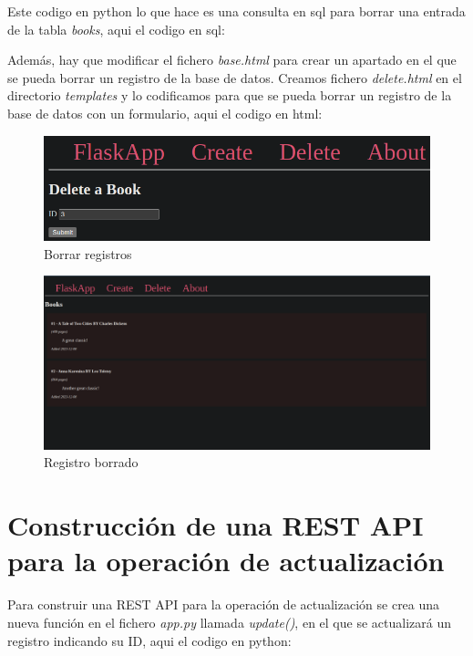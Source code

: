 \documentclass[11pt]{report}
\begin{document}
Este codigo en python lo que hace es una consulta en sql para borrar una entrada de la tabla \emph{books},
aqui el codigo en sql:
\lstset{style=mystyle}


Además, hay que modificar el fichero \emph{base.html} para crear un apartado en el que se pueda borrar
un registro de la base de datos. Creamos fichero \emph{delete.html} en el directorio \emph{templates} y
lo codificamos para que se pueda borrar un registro de la base de datos con un formulario, aqui el codigo
en html:
\lstset{style=mystyle}


\begin{figure}[H]
  \centering
  \includegraphics[scale=0.27]{img/delete_book.png}
  \caption{Borrar registros}
\end{figure}

\begin{figure}[H]
  \centering
  \includegraphics[scale=0.20]{img/book_already_deleted.png}
  \caption{Registro borrado}
\end{figure}

\section{Construcción de una REST API para la operación de actualización}
Para construir una REST API para la operación de actualización se crea una nueva función en el fichero \emph{app.py}
llamada \emph{update()}, en el que se actualizará un registro indicando su ID, aqui el codigo en python:
\lstset{style=mystyle}

\end{document}
